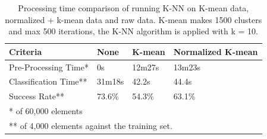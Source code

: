 \begin{table}[H]
\centering
\begin{tabular}{|l|p{2cm}|p{2cm}|p{2cm}|}\hline
Criteria              & None   & K-mean & Normalized K-mean \\ \hline
Pre-Processing Time*  & 0s     & 12m27s & 13m23s            \\ \hline
Classification Time** & 31m18s & 42.2s  & 44.4s             \\ \hline
Success Rate**        & 73.6\% & 54.3\% & 63.1\%            \\ \hline
\multicolumn{4}{|l|}{* of 60,000 elements} \\ 
\multicolumn{4}{|l|}{** of 4,000 elements against the training set.} \\ \hline
\end{tabular}
\caption{Processing time comparison of running K-NN on K-mean data, normalized + k-mean data and raw data. K-mean makes 1500 clusters and max 500 iterations, the K-NN algorithm is applied with k = 10.}
\label{tab:processingtime_kmean_vs_raw_knn}
\end{table}